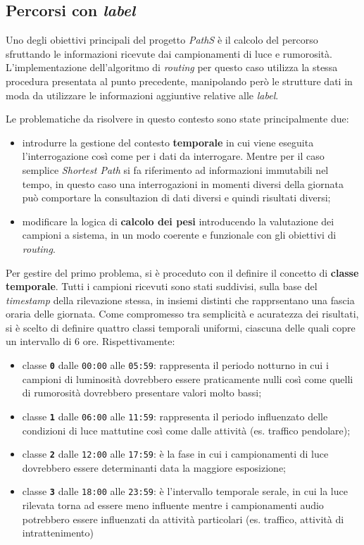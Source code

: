 \subsection{Percorsi con \emph{label}}
Uno degli obiettivi principali del progetto \emph{PathS} è il calcolo del percorso sfruttando le informazioni ricevute dai campionamenti di luce e rumorosità. L'implementazione dell'algoritmo di \emph{routing} per questo caso utilizza la stessa procedura presentata al punto precedente, manipolando però le strutture dati in moda da utilizzare le informazioni aggiuntive relative alle \emph{label}.

Le problematiche da risolvere in questo contesto sono state principalmente due:
\begin{itemize}
\item introdurre la gestione del contesto \textbf{temporale} in cui viene eseguita l'interrogazione così come per i dati da interrogare. Mentre per il caso semplice \emph{Shortest Path} si fa riferimento ad informazioni immutabili nel tempo, in questo caso una interrogazioni in momenti diversi della giornata può comportare la consultazion di dati diversi e quindi risultati diversi;
\item modificare la logica di \textbf{calcolo dei pesi} introducendo la valutazione dei campioni a sistema, in un modo coerente e funzionale con gli obiettivi di \emph{routing}. 
\end{itemize}
Per gestire del primo problema, si è proceduto con il definire il concetto di \textbf{classe temporale}. Tutti i campioni ricevuti sono stati suddivisi, sulla base del \emph{timestamp} della rilevazione stessa, in insiemi distinti che rapprsentano una fascia oraria delle giornata. Come compromesso tra semplicità e acuratezza dei risultati, si è scelto di definire quattro classi temporali uniformi, ciascuna delle quali copre un intervallo di 6 ore. Rispettivamente:
\begin{itemize}
\item classe \texttt{\textbf{0}} dalle \texttt{00:00} alle \texttt{05:59}: rappresenta il periodo notturno in cui i campioni di luminosità dovrebbero essere praticamente nulli così come quelli di rumorosità dovrebbero presentare valori molto bassi;
\item classe \texttt{\textbf{1}} dalle \texttt{06:00} alle \texttt{11:59}: rappresenta il periodo influenzato delle condizioni di luce mattutine così come dalle attività (es. traffico pendolare);
\item classe \texttt{\textbf{2}} dalle \texttt{12:00} alle \texttt{17:59}: è la fase in cui i campionamenti di luce dovrebbero essere determinanti data la maggiore esposizione;
\item classe \texttt{\textbf{3}} dalle \texttt{18:00} alle \texttt{23:59}: è l'intervallo temporale serale, in cui la luce rilevata torna ad essere meno influente mentre i campionamenti audio potrebbero essere influenzati da attività particolari (es. traffico, attività di intrattenimento)
\end{itemize}
